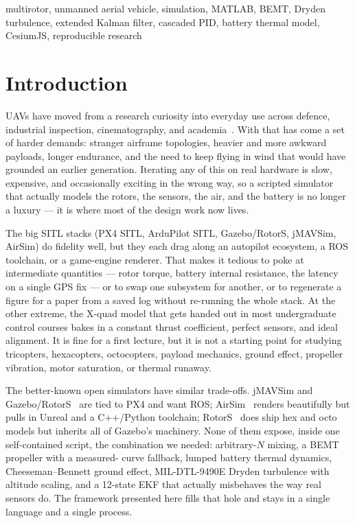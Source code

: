 \documentclass[a4paper, conference]{IEEEtran}
\begin{document}
\begin{IEEEkeywords}
multirotor, unmanned aerial vehicle, simulation, MATLAB, BEMT,
Dryden turbulence, extended Kalman filter, cascaded PID, battery
thermal model, CesiumJS, reproducible research
\end{IEEEkeywords}

\section{Introduction}
 UAVs have moved from a research
curiosity into everyday use across defence, industrial inspection,
cinematography, and academia~\cite{rotors2016}. With that has come
a set of harder demands: stranger airframe topologies, heavier and
more awkward payloads, longer endurance, and the need to keep
flying in wind that would have grounded an earlier generation.
Iterating any of this on real hardware is slow, expensive, and
occasionally exciting in the wrong way, so a scripted simulator
that actually models the rotors, the sensors, the air, and the
battery is no longer a luxury --- it is where most of the design
work now lives.

The big SITL stacks (PX4 SITL, ArduPilot SITL, Gazebo/RotorS,
jMAVSim, AirSim) do fidelity well, but they each drag along an
autopilot ecosystem, a ROS toolchain, or a game-engine renderer.
That makes it tedious to poke at intermediate quantities --- rotor
torque, battery internal resistance, the latency on a single GPS
fix --- or to swap one subsystem for another, or to regenerate a
figure for a paper from a saved log without re-running the whole
stack. At the other extreme, the X-quad model that gets handed out
in most undergraduate control courses bakes in a constant thrust
coefficient, perfect sensors, and ideal alignment. It is fine for a
first lecture, but it is not a starting point for studying
tricopters, hexacopters, octocopters, payload mechanics, ground
effect, propeller vibration, motor saturation, or thermal runaway.

The better-known open simulators have similar trade-offs. jMAVSim
and Gazebo/RotorS~\cite{ros2014} are tied to PX4 and want ROS;
AirSim~\cite{airsim2017} renders beautifully but pulls in Unreal
and a C++/Python toolchain; RotorS~\cite{rotors2016} does ship hex
and octo models but inherits all of Gazebo's machinery. None of
them expose, inside one self-contained script, the combination we
needed: arbitrary-$N$ mixing, a BEMT propeller with a measured-
curve fallback, lumped battery thermal dynamics, Cheeseman--Bennett
ground effect, MIL-DTL-9490E Dryden turbulence with altitude
scaling, and a 12-state EKF that actually misbehaves the way real
sensors do. The framework presented here fills that hole and stays
in a single language and a single process.
\end{document}
